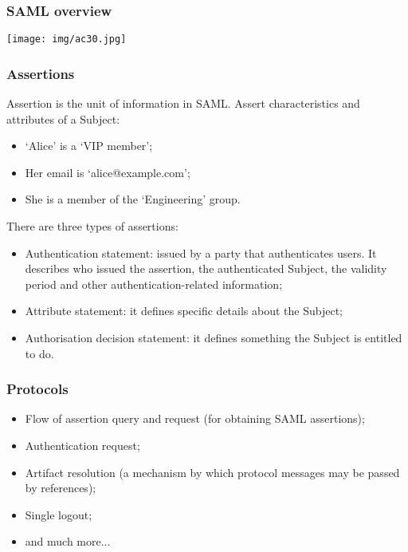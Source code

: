 \documentclass[a4paper, 10pt, titlepage]{article}
\begin{document}
\subsubsection{SAML overview}
\begin{center}
\texttt{[image: img/ac30.jpg]}
\end{center}
\subsubsection*{Assertions}
Assertion is the unit of information in SAML. Assert characteristics and attributes of a Subject:
\begin{itemize}
\item ‘Alice’ is a ‘VIP member’;
\item Her email is ‘alice@example.com’;
\item She is a member of the ‘Engineering’ group.
\end{itemize} 
There are three types of assertions:
\begin{itemize}
\item Authentication statement: issued by a party that authenticates users. It describes who issued the assertion, the authenticated Subject, the validity period and other authentication-related information;
\item Attribute statement: it defines specific details about the Subject;
\item Authorisation decision statement: it defines something the Subject is entitled to do.
\end{itemize}

\subsubsection*{Protocols}
\begin{itemize}
\item Flow of assertion query and request (for obtaining SAML assertions);
\item Authentication request;
\item Artifact resolution (a mechanism by which protocol messages may be passed by references);
\item Single logout;
\item and much more...
\end{itemize}
\end{document}
